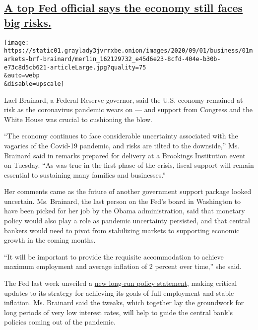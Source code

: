 \hypertarget{a-top-fed-official-says-the-economy-still-faces-big-risks}{%
\subsection{\texorpdfstring{\protect\hyperlink{a-top-fed-official-says-the-economy-still-faces-big-risks}{A
top Fed official says the economy still faces big
risks.}}{A top Fed official says the economy still faces big risks.}}\label{a-top-fed-official-says-the-economy-still-faces-big-risks}}

\texttt{[image: https://static01.graylady3jvrrxbe.onion/images/2020/09/01/business/01markets-brf-brainard/merlin\_162129732\_e45d6e23-8cfd-404e-b30b-e73c8d5cb621-articleLarge.jpg?quality=75\\\&auto=webp\\\&disable=upscale]}

Lael Brainard, a Federal Reserve governor, said the U.S. economy
remained at risk as the coronavirus pandemic wears on --- and support
from Congress and the White House was crucial to cushioning the blow.

``The economy continues to face considerable uncertainty associated with
the vagaries of the Covid-19 pandemic, and risks are tilted to the
downside,'' Ms. Brainard said in remarks prepared for delivery at a
Brookings Institution event on Tuesday. ``As was true in the first phase
of the crisis, fiscal support will remain essential to sustaining many
families and businesses.''

Her comments came as the future of another government support package
looked uncertain. Ms. Brainard, the last person on the Fed's board in
Washington to have been picked for her job by the Obama administration,
said that monetary policy would also play a role as pandemic uncertainty
persisted, and that central bankers would need to pivot from stabilizing
markets to supporting economic growth in the coming months.

``It will be important to provide the requisite accommodation to achieve
maximum employment and average inflation of 2 percent over time,'' she
said.

The Fed last week unveiled a
\href{https://www.nytimes3xbfgragh.onion/2020/08/27/business/economy/federal-reserve-inflation-jerome-powell.html}{new
long-run policy statement}, making critical updates to its strategy for
achieving its goals of full employment and stable inflation. Ms.
Brainard said the tweaks, which together lay the groundwork for long
periods of very low interest rates, will help to guide the central
bank's policies coming out of the pandemic.

